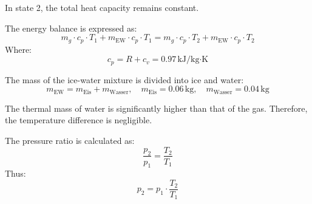 In state 2, the total heat capacity remains constant.  

The energy balance is expressed as:  
\[
m_g \cdot c_p \cdot T_1 + m_{\text{EW}} \cdot c_p \cdot T_1 = m_g \cdot c_p \cdot T_2 + m_{\text{EW}} \cdot c_p \cdot T_2
\]  
Where:  
\[
c_p = R + c_v = 0.97 \, \text{kJ/kg·K}
\]  

The mass of the ice-water mixture is divided into ice and water:  
\[
m_{\text{EW}} = m_{\text{Eis}} + m_{\text{Wasser}}, \quad m_{\text{Eis}} = 0.06 \, \text{kg}, \quad m_{\text{Wasser}} = 0.04 \, \text{kg}
\]  

The thermal mass of water is significantly higher than that of the gas. Therefore, the temperature difference is negligible.  

The pressure ratio is calculated as:  
\[
\frac{p_2}{p_1} = \frac{T_2}{T_1}
\]  
Thus:  
\[
p_2 = p_1 \cdot \frac{T_2}{T_1}
\]